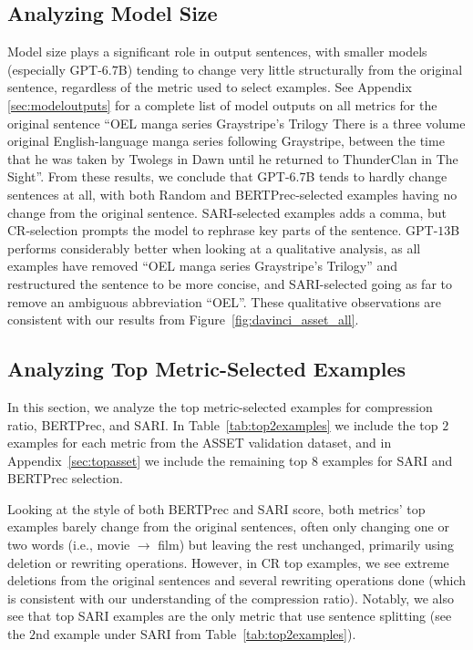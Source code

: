 \documentclass[11pt]{article}
\begin{document}
\subsection{Analyzing Model Size}
Model size plays a significant role in output sentences, with smaller models (especially GPT-$6.7$B) tending to change very little structurally from the original sentence, regardless of the metric used to select examples. See Appendix \ref{sec:modeloutputs} for a complete list of model outputs on all metrics for the original sentence ``OEL manga series Graystripe's Trilogy There is a three volume original English-language manga series following Graystripe, between the time that he was taken by Twolegs in Dawn until he returned to ThunderClan in The Sight''. From these results, we conclude that GPT-$6.7$B tends to hardly change sentences at all, with both Random and BERTPrec-selected examples having no change from the original sentence. SARI-selected examples adds a comma, but CR-selection prompts the model to rephrase key parts of the sentence. GPT-$13$B performs considerably better when looking at a qualitative analysis, as all examples have removed ``OEL manga series Graystripe's Trilogy'' and restructured the sentence to be more concise, and SARI-selected going as far to remove an ambiguous abbreviation ``OEL''. These qualitative observations are consistent with our results from Figure~\ref{fig:davinci_asset_all}.

\subsection{Analyzing Top Metric-Selected Examples}
In this section, we analyze the top metric-selected examples for compression ratio, BERTPrec, and SARI. In Table~\ref{tab:top2examples} we include the top $2$ examples for each metric from the ASSET validation dataset, and in Appendix~\ref{sec:topasset} we include the remaining top $8$ examples for SARI and BERTPrec selection. 

Looking at the style of both BERTPrec and SARI score, both metrics' top examples barely change from the original sentences, often only changing one or two words (i.e., movie $\rightarrow$ film) but leaving the rest unchanged, primarily using deletion or rewriting operations. However, in CR top examples, we see extreme deletions from the original sentences and several rewriting operations done (which is consistent with our understanding of the compression ratio). Notably, we also see that top SARI examples are the only metric that use sentence splitting (see the $2$nd example under SARI from Table~\ref{tab:top2examples}). 
 
\end{document}

